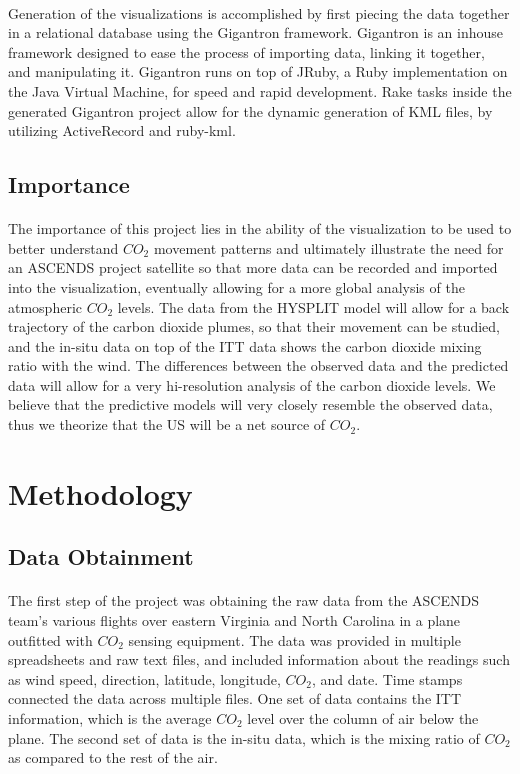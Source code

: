 \documentclass[12pt,letterpaper]{report}
\begin{document}
   \paragraph{}
    Generation of the visualizations is accomplished by first piecing the data together in a relational database using the Gigantron framework. Gigantron is an inhouse framework designed to ease the process of importing data, linking it together, and manipulating it. Gigantron runs on top of JRuby, a Ruby implementation on the Java Virtual Machine, for speed and rapid development. Rake tasks inside the generated Gigantron project allow for the dynamic generation of KML files, by utilizing ActiveRecord and ruby-kml.

  \subsection*{Importance}
   \paragraph{}
    The importance of this project lies in the ability of the visualization to be used to better understand $CO_2$ movement patterns and ultimately illustrate the need for an ASCENDS project satellite so that more data can be recorded and imported into the visualization, eventually allowing for a more global analysis of the atmospheric $CO_2$ levels. The data from the HYSPLIT model will allow for a back trajectory of the carbon dioxide plumes, so that their movement can be studied, and the in-situ data on top of the ITT data shows the carbon dioxide mixing ratio with the wind. The differences between the observed data and the predicted data will allow for a very hi-resolution analysis of the carbon dioxide levels. We believe that the predictive models will very closely resemble the observed data, thus we theorize that the US will be a net source of $CO_2$.
 \section*{Methodology}
  \subsection*{Data Obtainment}
   \paragraph{}
    The first step of the project was obtaining the raw data from the ASCENDS team’s various flights over eastern Virginia and North Carolina in a plane outfitted with $CO_2$ sensing equipment. The data was provided in multiple spreadsheets and raw text files, and included information about the readings such as wind speed, direction, latitude, longitude, $CO_2$, and date. Time stamps connected the data across multiple files. One set of data contains the ITT information, which is the average $CO_2$ level over the column of air below the plane. The second set of data is the in-situ data, which is the mixing ratio of $CO_2$ as compared to the rest of the air.
\end{document}
